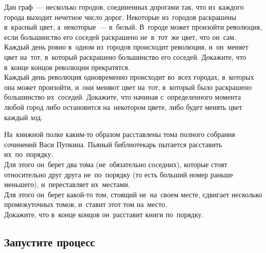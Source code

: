 \begin{problems}

\item
Дан граф~--- несколько городов, соединенных дорогами так, что из~каждого города
выходит нечетное число дорог.
Некоторые из~городов раскрашены в~красный цвет, а~некоторые~--- в~белый.
В~городе может произойти революция, если большинство его соседей раскрашено
не~в~тот~же цвет, что он~сам.
\\
\sp
Каждый день ровно в~одном из~городов происходит революция, и~он~меняет цвет
на~тот, в~который раскрашено большинство его соседей.
Докажите, что в~конце концов революции прекратятся.
\\
\sp
Каждый день революция одновременно происходит во~всех городах, в~которых она
может произойти, и~они меняют цвет на~тот, в~который было раскрашено
большинство их~соседей.
Докажите, что начиная с~определенного момента любой город либо остановится
на~некотором цвете, либо будет менять цвет каждый ход.

\item
На~книжной полке каким-то образом расставлены тома полного собрания сочинений
Васи Пупкина.
Пьяный библиотекарь пытается расставить их~по~порядку.
\\
\sp
Для этого он~берет два тома (не~обязательно соседних), которые стоят
относительно друг друга не~по~порядку (то есть больший номер раньше меньшего),
и~переставляет их~местами.
\\
\sp
Для этого он~берет какой-то том, стоящий не~на~своем месте, сдвигает несколько
промежуточных томов, и~ставит этот том на~место.
\\
Докажите, что в~конце концов он~расставит книги по~порядку.

\end{problems}

\subsection*{Запустите процесс}

